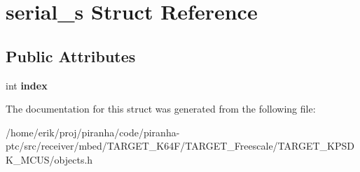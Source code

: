 \hypertarget{structserial__s}{}\section{serial\+\_\+s Struct Reference}
\label{structserial__s}
\subsection*{Public Attributes}
\begin{DoxyCompactItemize}
\item 
int {\bfseries index}\hypertarget{structserial__s_a6d2c4aa9f7793e754e983aead3238405}{}\label{structserial__s_a6d2c4aa9f7793e754e983aead3238405}

\end{DoxyCompactItemize}


The documentation for this struct was generated from the following file\+:\begin{DoxyCompactItemize}
\item 
/home/erik/proj/piranha/code/piranha-\/ptc/src/receiver/mbed/\+T\+A\+R\+G\+E\+T\+\_\+\+K64\+F/\+T\+A\+R\+G\+E\+T\+\_\+\+Freescale/\+T\+A\+R\+G\+E\+T\+\_\+\+K\+P\+S\+D\+K\+\_\+\+M\+C\+U\+S/objects.\+h\end{DoxyCompactItemize}
